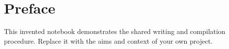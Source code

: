 \chapter*{Preface}
This invented notebook demonstrates the shared writing and compilation procedure.
Replace it with the aims and context of your own project.
